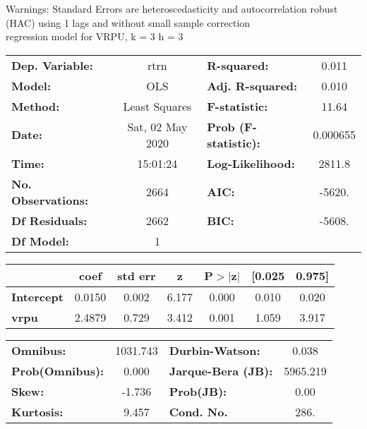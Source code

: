 Warnings: \newline
 [1] Standard Errors are heteroscedasticity and autocorrelation robust (HAC) using 1 lags and without small sample correction\\ 

regression model for VRPU, k = 3 h = 3\begin{center}
\begin{tabular}{lclc}
\toprule
\textbf{Dep. Variable:}    &       rtrn       & \textbf{  R-squared:         } &     0.011   \\
\textbf{Model:}            &       OLS        & \textbf{  Adj. R-squared:    } &     0.010   \\
\textbf{Method:}           &  Least Squares   & \textbf{  F-statistic:       } &     11.64   \\
\textbf{Date:}             & Sat, 02 May 2020 & \textbf{  Prob (F-statistic):} &  0.000655   \\
\textbf{Time:}             &     15:01:24     & \textbf{  Log-Likelihood:    } &    2811.8   \\
\textbf{No. Observations:} &        2664      & \textbf{  AIC:               } &    -5620.   \\
\textbf{Df Residuals:}     &        2662      & \textbf{  BIC:               } &    -5608.   \\
\textbf{Df Model:}         &           1      & \textbf{                     } &             \\
\bottomrule
\end{tabular}
\begin{tabular}{lcccccc}
                   & \textbf{coef} & \textbf{std err} & \textbf{z} & \textbf{P$> |$z$|$} & \textbf{[0.025} & \textbf{0.975]}  \\
\midrule
\textbf{Intercept} &       0.0150  &        0.002     &     6.177  &         0.000        &        0.010    &        0.020     \\
\textbf{vrpu}      &       2.4879  &        0.729     &     3.412  &         0.001        &        1.059    &        3.917     \\
\bottomrule
\end{tabular}
\begin{tabular}{lclc}
\textbf{Omnibus:}       & 1031.743 & \textbf{  Durbin-Watson:     } &    0.038  \\
\textbf{Prob(Omnibus):} &   0.000  & \textbf{  Jarque-Bera (JB):  } & 5965.219  \\
\textbf{Skew:}          &  -1.736  & \textbf{  Prob(JB):          } &     0.00  \\
\textbf{Kurtosis:}      &   9.457  & \textbf{  Cond. No.          } &     286.  \\
\bottomrule
\end{tabular}
\end{center}

